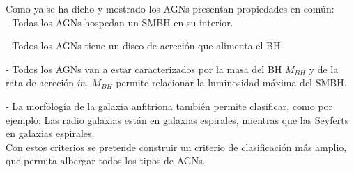 Como ya se ha dicho y mostrado los AGNs presentan propiedades en común: \\

- Todas los AGNs hospedan un SMBH en su interior. 

- Todos los AGNs tiene un disco de acreción que alimenta el BH.

- Todos los AGNs van a estar caracterizados por la masa del BH $M_{BH}$ y de la rata de acreción $\dot{m}$. $M_{BH}$ permite relacionar la luminosidad máxima del SMBH. 

- La morfología de la galaxia anfitriona también permite clasificar, como por ejemplo: Las radio galaxias están en galaxias espirales, mientras que las Seyferts en galaxias espirales.\\

Con estos criterios se pretende construir un criterio de clasificación más amplio, que permita albergar todos los tipos de AGNs.





